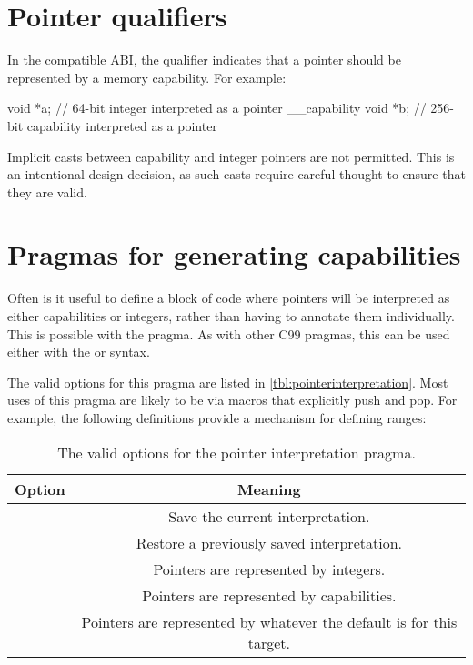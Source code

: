 \section{Pointer qualifiers}

In the compatible ABI, the  qualifier indicates that a pointer should be represented by a memory capability.
For example:

\begin{csnippet}
void *a; // 64-bit integer interpreted as a pointer
__capability void *b; // 256-bit capability interpreted as a pointer
\end{csnippet}

Implicit casts between capability and integer pointers are not permitted.
This is an intentional design decision, as such casts require careful thought to ensure that they are valid.

\section{Pragmas for generating capabilities}

Often is it useful to define a block of code where pointers will be interpreted as either capabilities or integers, rather than having to annotate them individually.
This is possible with the  pragma.
As with other C99 pragmas, this can be used either with the  or  syntax.

The valid options for this pragma are listed in \autoref{tbl:pointerinterpretation}.
Most uses of this pragma are likely to be via macros that explicitly push and pop.
For example, the following definitions provide a mechanism for defining ranges:

\begin{table}
	\begin{center}
		\begin{tabu}{*{2}{c}}
			\toprule
			\headerrow
			Option & Meaning\\
			\midrule
			 & Save the current interpretation. \\
			 & Restore a previously saved interpretation. \\
			 & Pointers are represented by integers. \\
			 & Pointers are represented by capabilities. \\
			 & Pointers are represented by whatever the default is for this target. \\
			\bottomrule
		\end{tabu}
		\caption{\label{tbl:pointerinterpretation}The valid options for the pointer interpretation pragma.}
	\end{center}
\end{table}

